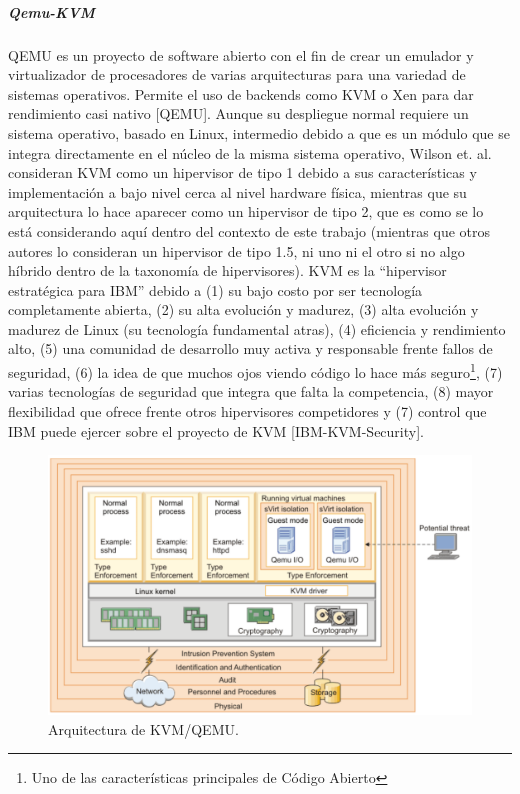 \subparagraph{Qemu-KVM}
QEMU es un proyecto de software abierto con el fin de crear un emulador y virtualizador de procesadores de varias arquitecturas para una variedad de sistemas operativos. Permite el uso de backends como KVM o Xen para dar rendimiento casi nativo [QEMU]. Aunque su despliegue normal requiere un sistema operativo, basado en Linux, intermedio debido a que es un módulo que se integra directamente en el núcleo de la misma sistema operativo, Wilson et. al. consideran KVM como un hipervisor de tipo 1 debido a sus características y implementación a bajo nivel cerca al nivel hardware física, mientras que su arquitectura lo hace aparecer como un hipervisor de tipo 2, que es como se lo está considerando aquí dentro del contexto de este trabajo (mientras que otros autores lo consideran un hipervisor de tipo 1.5, ni uno ni el otro si no algo híbrido dentro de la taxonomía de hipervisores). KVM es la “hipervisor estratégica para IBM” debido a (1) su bajo costo por ser tecnología completamente abierta, (2) su alta evolución y madurez, (3) alta evolución y madurez de Linux (su tecnología fundamental atras), (4) eficiencia y rendimiento alto, (5) una comunidad de desarrollo muy activa y responsable frente fallos de seguridad, (6) la idea de que muchos ojos viendo código lo hace más seguro\footnote{Uno de las características principales de Código Abierto}, (7) varias tecnologías de seguridad que integra que falta la competencia, (8) mayor flexibilidad que ofrece frente otros hipervisores competidores y (7) control que IBM puede ejercer sobre el proyecto de KVM [IBM-KVM-Security].

\begin{figure}
  \begin{center}
      \includegraphics[width=\textwidth]{Figures/kvm-arq.png}
  \end{center}
  \caption{Arquitectura de KVM/QEMU.} 
  \label{KVM-Arq}
\end{figure}

